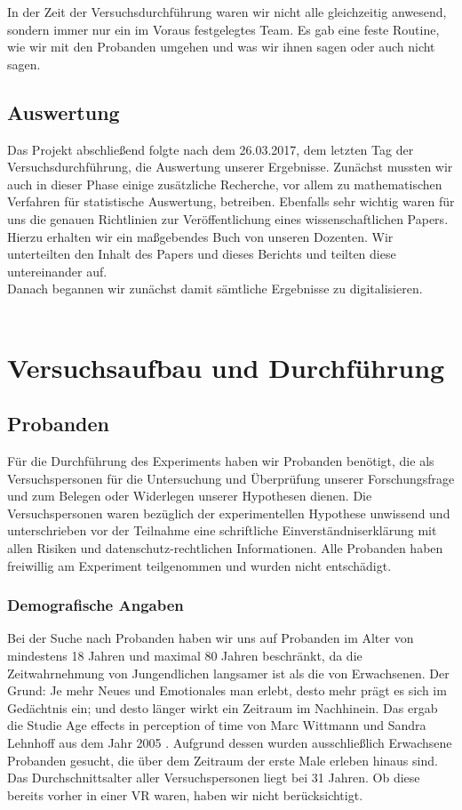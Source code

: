 \documentclass{Bericht}
\begin{document}
		In der Zeit der Versuchsdurchführung waren wir nicht alle gleichzeitig anwesend, sondern immer nur ein im Voraus festgelegtes Team. Es gab eine feste Routine, wie wir mit den Probanden umgehen und was wir ihnen sagen oder auch nicht sagen. 
		
	\subsection{Auswertung} %
	
		Das Projekt abschließend folgte nach dem 26.03.2017, dem letzten Tag der Versuchsdurchführung, die Auswertung unserer Ergebnisse.
		Zunächst mussten wir auch in dieser Phase einige zusätzliche Recherche, vor allem zu mathematischen Verfahren für statistische Auswertung, betreiben. Ebenfalls sehr wichtig waren für uns die genauen Richtlinien zur Veröffentlichung eines wissenschaftlichen Papers. Hierzu erhalten wir ein maßgebendes Buch von unseren Dozenten. Wir unterteilten den Inhalt des Papers und dieses Berichts und teilten diese untereinander auf.\\
		Danach begannen wir zunächst damit sämtliche Ergebnisse zu digitalisieren.\\
\\
\clearpage
\section{Versuchsaufbau und Durchführung} %
	
	\subsection{Probanden}
Für die Durchführung des Experiments haben wir Probanden benötigt, die als Versuchspersonen für die Untersuchung und Überprüfung unserer Forschungsfrage und zum Belegen oder Widerlegen unserer Hypothesen dienen. 
Die Versuchspersonen waren bezüglich der experimentellen Hypothese unwissend und unterschrieben vor der Teilnahme eine schriftliche Einverständniserklärung mit allen Risiken und datenschutz-rechtlichen Informationen. Alle Probanden haben freiwillig am Experiment teilgenommen und wurden nicht entschädigt. 

\subsubsection{Demografische Angaben}

Bei der Suche nach Probanden haben wir uns auf Probanden im Alter von mindestens 18 Jahren und maximal 80 Jahren beschränkt, da die Zeitwahrnehmung von Jungendlichen langsamer ist als die von Erwachsenen. Der Grund: Je mehr Neues und Emotionales man erlebt, desto mehr prägt es sich im Gedächtnis ein; und desto länger wirkt ein Zeitraum im Nachhinein. Das ergab die Studie \glqq Age effects in perception of time\grqq{} von Marc Wittmann und Sandra Lehnhoff aus dem Jahr 2005 \cite{AgeEffects}. Aufgrund dessen wurden ausschließlich Erwachsene Probanden gesucht, die über dem Zeitraum der \glqq erste Male erleben\grqq{} hinaus sind. Das Durchschnittsalter aller Versuchspersonen liegt bei 31 Jahren. Ob diese bereits vorher in einer VR waren, haben wir nicht berücksichtigt.
\end{document}
